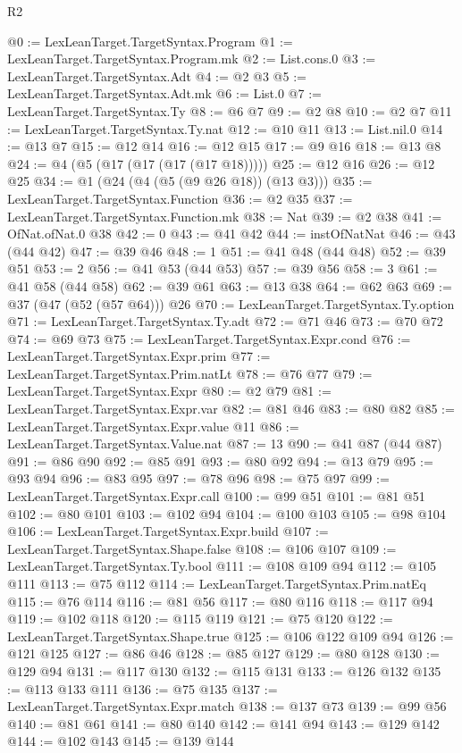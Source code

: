\begin{lexlean}{R2}
\begin{coremodule}
@0 := LexLeanTarget.TargetSyntax.Program
@1 := LexLeanTarget.TargetSyntax.Program.mk
@2 := List.cons.{0}
@3 := LexLeanTarget.TargetSyntax.Adt
@4 := @2 @3
@5 := LexLeanTarget.TargetSyntax.Adt.mk
@6 := List.{0}
@7 := LexLeanTarget.TargetSyntax.Ty
@8 := @6 @7
@9 := @2 @8
@10 := @2 @7
@11 := LexLeanTarget.TargetSyntax.Ty.nat
@12 := @10 @11
@13 := List.nil.{0}
@14 := @13 @7
@15 := @12 @14
@16 := @12 @15
@17 := @9 @16
@18 := @13 @8
@24 := @4 (@5 (@17 (@17 (@17 (@17 @18)))))
@25 := @12 @16
@26 := @12 @25
@34 := @1 (@24 (@4 (@5 (@9 @26 @18)) (@13 @3)))
@35 := LexLeanTarget.TargetSyntax.Function
@36 := @2 @35
@37 := LexLeanTarget.TargetSyntax.Function.mk
@38 := Nat
@39 := @2 @38
@41 := OfNat.ofNat.{0} @38
@42 := 0
@43 := @41 @42
@44 := instOfNatNat
@46 := @43 (@44 @42)
@47 := @39 @46
@48 := 1
@51 := @41 @48 (@44 @48)
@52 := @39 @51
@53 := 2
@56 := @41 @53 (@44 @53)
@57 := @39 @56
@58 := 3
@61 := @41 @58 (@44 @58)
@62 := @39 @61
@63 := @13 @38
@64 := @62 @63
@69 := @37 (@47 (@52 (@57 @64))) @26
@70 := LexLeanTarget.TargetSyntax.Ty.option
@71 := LexLeanTarget.TargetSyntax.Ty.adt
@72 := @71 @46
@73 := @70 @72
@74 := @69 @73
@75 := LexLeanTarget.TargetSyntax.Expr.cond
@76 := LexLeanTarget.TargetSyntax.Expr.prim
@77 := LexLeanTarget.TargetSyntax.Prim.natLt
@78 := @76 @77
@79 := LexLeanTarget.TargetSyntax.Expr
@80 := @2 @79
@81 := LexLeanTarget.TargetSyntax.Expr.var
@82 := @81 @46
@83 := @80 @82
@85 := LexLeanTarget.TargetSyntax.Expr.value @11
@86 := LexLeanTarget.TargetSyntax.Value.nat
@87 := 13
@90 := @41 @87 (@44 @87)
@91 := @86 @90
@92 := @85 @91
@93 := @80 @92
@94 := @13 @79
@95 := @93 @94
@96 := @83 @95
@97 := @78 @96
@98 := @75 @97
@99 := LexLeanTarget.TargetSyntax.Expr.call
@100 := @99 @51
@101 := @81 @51
@102 := @80 @101
@103 := @102 @94
@104 := @100 @103
@105 := @98 @104
@106 := LexLeanTarget.TargetSyntax.Expr.build
@107 := LexLeanTarget.TargetSyntax.Shape.false
@108 := @106 @107
@109 := LexLeanTarget.TargetSyntax.Ty.bool
@111 := @108 @109 @94
@112 := @105 @111
@113 := @75 @112
@114 := LexLeanTarget.TargetSyntax.Prim.natEq
@115 := @76 @114
@116 := @81 @56
@117 := @80 @116
@118 := @117 @94
@119 := @102 @118
@120 := @115 @119
@121 := @75 @120
@122 := LexLeanTarget.TargetSyntax.Shape.true
@125 := @106 @122 @109 @94
@126 := @121 @125
@127 := @86 @46
@128 := @85 @127
@129 := @80 @128
@130 := @129 @94
@131 := @117 @130
@132 := @115 @131
@133 := @126 @132
@135 := @113 @133 @111
@136 := @75 @135
@137 := LexLeanTarget.TargetSyntax.Expr.match
@138 := @137 @73
@139 := @99 @56
@140 := @81 @61
@141 := @80 @140
@142 := @141 @94
@143 := @129 @142
@144 := @102 @143
@145 := @139 @144

\end{coremodule}
\end{lexlean}
